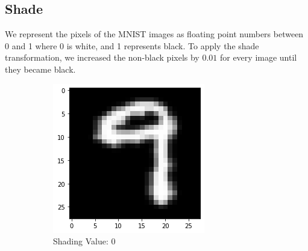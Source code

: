 \subsection{Shade}
We represent the pixels of the MNIST images as floating point numbers between 0 and 1 where 0 is white, and 1 represents black. To apply the shade transformation, we increased the non-black pixels by $0.01$ for every image until they became black.
    \begin{figure}[htb!]
        \centering
        \begin{subfigure}[b]{.3\textwidth}
            \centering
            \includegraphics[width=\linewidth]{images/shade1.png}
            \caption{Shading Value: 0}
            \label{fig:Rotate-misclass0}
        \end{subfigure}%
        \begin{subfigure}[b]{.3\textwidth}
            \centering

\end{subfigure}
\end{figure}
